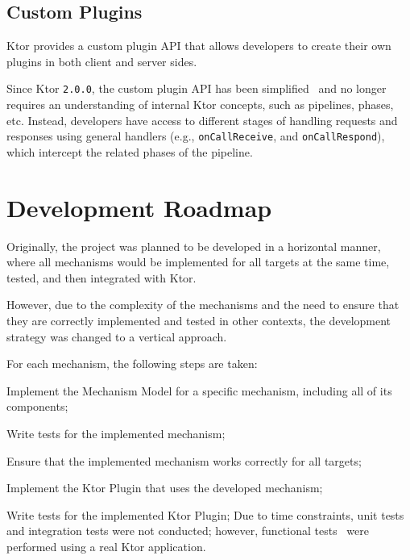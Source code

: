 \subsection{Custom Plugins}\label{subsec:custom-plugins}

Ktor provides a custom plugin API that allows developers to create their own plugins in both client and server sides.

Since Ktor \texttt{2.0.0}, the custom plugin API has been simplified~\cite{ktor-server-custom-plugins, ktor-client-custom-plugins} and no longer requires an understanding of internal Ktor concepts, such as pipelines, phases, etc.
Instead, developers have access to different stages of handling requests and responses using general handlers (e.g., \texttt{onCallReceive}, and \texttt{onCallRespond}), which intercept the related phases of the pipeline.


\section{Development Roadmap}\label{sec:development-roadmap}

Originally, the project was planned to be developed in a horizontal manner, where all mechanisms would be implemented for all targets at the same time, tested, and then integrated with Ktor.

However, due to the complexity of the mechanisms and the need to ensure that they are correctly implemented and tested
in other contexts, the development strategy was changed to a vertical approach.

For each mechanism, the following steps are taken:
\begin{boldenumerate}
    \item Implement the Mechanism Model for a specific mechanism, including all of its components;
    \item Write tests for the implemented mechanism;
    \item Ensure that the implemented mechanism works correctly for all targets;
    \item Implement the Ktor Plugin that uses the developed mechanism;
    \item Write tests for the implemented Ktor Plugin;
    Due to time constraints, unit tests and integration tests were not conducted; however, functional tests~\cite{software-test-types} were performed using a real Ktor application.
\end{boldenumerate}
